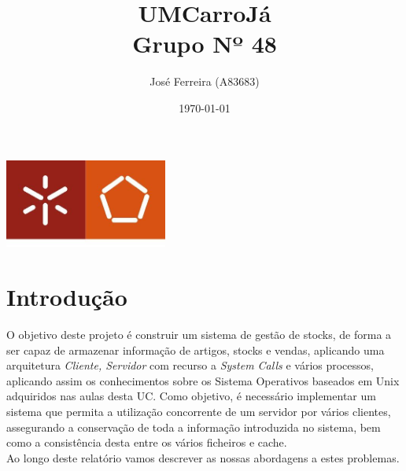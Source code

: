 \documentclass[a4paper]{report}
\begin{document}
\title{UMCarroJá\\ 
\large Grupo Nº 48}
\author{José Ferreira (A83683)}
\date{\today}

\begin{center}
    \begin{minipage}{0.75\linewidth}
        \centering
        \includegraphics[width=0.4\textwidth]{eng.jpeg}\par\vspace{1cm}
        \vspace{1.5cm}
        \href{https://www.uminho.pt/PT}
        {\color{black}{\scshape\LARGE Universidade do Minho}} \par
        \vspace{1cm}
        \href{https://www.di.uminho.pt/}
        {\color{black}{\scshape\Large Departamento de Informática}} \par
        \vspace{1.5cm}
        \maketitle
    \end{minipage}
\end{center}

\tableofcontents

\pagebreak

\chapter{Introdução}

O objetivo deste projeto é construir um sistema de gestão de stocks,
de forma a ser capaz de armazenar informação de artigos, stocks e vendas,
aplicando uma arquitetura \textit{Cliente, Servidor} com recurso a \textit{System Calls}
e vários processos, aplicando assim os conhecimentos sobre os Sistema Operativos 
baseados em Unix adquiridos nas aulas desta UC\@.
Como objetivo, é necessário implementar um sistema que permita a utilização concorrente de 
um servidor por vários clientes, assegurando a conservação de toda a informação
introduzida no sistema, bem como a consistência desta entre os vários ficheiros
e cache.\\
Ao longo deste relatório vamos descrever as nossas abordagens a estes problemas.
\end{document}
